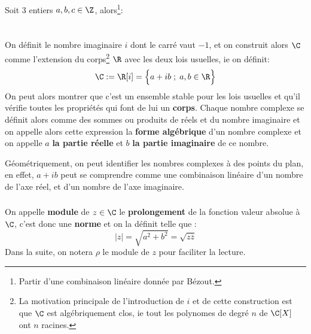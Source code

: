 \subsection*{}
Soit 3 entiers \(a, b, c \in \Z\), alors\footnote[1]{Partir d'une combinaison linéaire donnée par Bézout.}:
\chapter*{} %

On définit le nombre imaginaire \(i\) dont le carré vaut \(-1\), et on construit alors \(\C\) comme l'extension du corps\footnote[1]{La motivation principale de l'introduction de \(i\) et de cette construction est que \(\C\) est algébriquement clos, ie tout les polynomes de degré \(n\) de \(\C[X]\) ont \(n\) racines.} \(\R\) avec les deux lois usuelles, ie on définit:
\[
   \C := \R[i] = \Bigl\{a + ib \; ; \; a, b \in \R \Bigl\}
\]
On peut alors montrer que c'est un ensemble stable pour les lois usuelles et qu'il vérifie toutes les propriétés qui font de lui un \textbf{corps}.\+
Chaque nombre complexe se définit alors comme des sommes ou produits de réels et du nombre imaginaire et on appelle alors cette expression la \textbf{forme algébrique} d'un nombre complexe et on appelle \(a\) \textbf{la partie réelle} et \(b\) \textbf{la partie imaginaire} de ce nombre. \<

Géométriquement, on peut identifier les nombres complexes à des points du plan, en effet, \(a + ib\) peut se comprendre comme une combinaison linéaire d'un nombre de l'axe réel, et d'un nombre de l'axe imaginaire.

\subsection*{}
On appelle \textbf{module} de \(z \in \C\) le \textbf{prolongement} de la fonction valeur absolue à \(\C\), c'est donc une \textbf{norme} et on la définit telle que {:}
\[
   |z| = \sqrt{a^2 + b^2} = \sqrt{z\overline{z}} 
\]
Dans la suite, on notera \(\rho\) le module de \(z\) pour faciliter la lecture.

